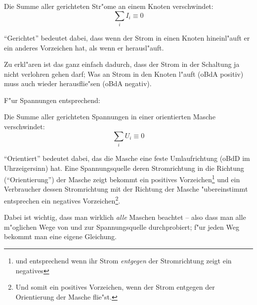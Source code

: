 \begin{Wichtig}
Die Summe aller gerichteten Str"ome an einem Knoten verschwindet:
\begin{equation}
   \label{eq:170}
   \sum_i I_i \equiv 0
\end{equation}
\end{Wichtig}

"`Gerichtet"' bedeutet dabei, dass wenn der Strom in einen Knoten
hineinl"auft er ein anderes Vorzeichen hat, als wenn er herausl"auft.

Zu erkl"aren ist das ganz einfach dadurch, dass der Strom in der
Schaltung ja nicht verlohren gehen darf; Was an Strom in den Knoten
l"auft (oBdA positiv) muss auch wieder herausflie"sen (oBdA negativ).

F"ur Spannungen entsprechend:
\begin{Wichtig}
Die Summe aller gerichteten Spannungen in einer orientierten Masche
verschwindet:
\begin{equation}
   \label{eq:171}
   \sum_i U_i \equiv 0
\end{equation}
\end{Wichtig}

"`Orientiert"' bedeutet dabei, das die Masche eine feste
Umlaufrichtung (oBdD im Uhrzeigersinn) hat.
Eine Spannungsquelle deren Stromrichtung in die Richtung
("`Orientierung"') der Masche zeigt bekommt ein positives
Vorzeichen\footnote{und entsprechend wenn ihr Strom \emph{entgegen}
  der Stromrichtung zeigt ein negatives} und ein Verbraucher dessen
Stromrichtung mit der Richtung der Masche "ubereinstimmt entsprechen
ein negatives Vorzeichen\footnote{Und somit ein positives Vorzeichen,
  wenn der Strom entgegen der Orientierung der Masche flie"st.}.

\begin{Wichtig}
   Dabei ist wichtig, dass man wirklich \emph{alle} Maschen beachtet
   -- also dass man alle m"oglichen Wege von und zur Spannungsquelle
   durchprobiert; f"ur jeden Weg bekommt man eine eigene Gleichung.
\end{Wichtig}


